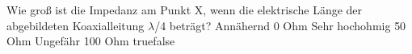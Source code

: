    {Wie groß ist die Impedanz am Punkt X, wenn die elektrische Länge der abgebildeten Koaxialleitung $\lambda$/4 beträgt?}
    {Annähernd 0 Ohm}
    {Sehr hochohmig}
    {50 Ohm}
    {Ungefähr 100 Ohm}
    {true}{false}
